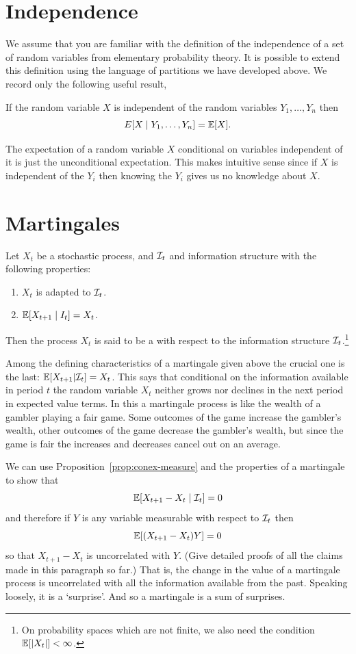 \documentclass[11pt,reqno,openany]{amsbook}
\begin{document}
\section{Independence}
We assume that you are familiar with the definition of the
independence of a set of random variables from elementary
probability theory. It is possible to extend this definition
using the language of partitions we have developed above. We
record only the following useful result,

\begin{prop}
  If the random variable $X$ is independent of the random
  variables $Y_1,\ldots,Y_n$ then
  \[E[X \mid Y_1,\ldots,Y_n] = \mathbb{E}[X].\]
\end{prop}
The expectation of a random variable $X$ conditional on
variables independent of it is just the unconditional
expectation. This makes intuitive sense since if $X$ is
independent of the $Y_i$ then knowing the $Y_i$ gives us no
knowledge about $X$.


\section{Martingales}
\begin{defn}[Martingale]
Let $X_t$ be a stochastic process, and $\mathcal{I}_t$ and
information structure with the following properties:
\begin{enumerate}
\item $X_t$ is adapted to $\mathcal{I}_t$.
\item $\mathbb{E}[X_{t+1} \mid I_t]=X_t$.
\end{enumerate}
Then the process $X_t$ is said to be a  with
respect to the information structure
$\mathcal{I}_t$.\footnote{On probability spaces which are not
  finite, we also need the condition $\mathbb{E}[|X_t|]<\infty$.}
\end{defn}

Among the defining characteristics of a martingale given above the
crucial one is the last: $\mathbb{E}[X_{t+1}|\mathcal{I}_t]=X_t$. This says that
conditional on the information available in period $t$ the random
variable $X_t$ neither grows nor declines in the next period in
expected value terms. In this a martingale process is like the wealth
of a gambler playing a fair game. Some outcomes of the game increase
the gambler's wealth, other outcomes of the game decrease the
gambler's wealth, but since the game is fair the increases and
decreases cancel out on an average.

We can use Proposition~\ref{prop:conex-measure} and the properties of
a martingale to show that
\[\mathbb{E}[X_{t+1}-X_t \mid \mathcal{I}_t]=0\]
and therefore if $Y$ is any variable measurable with respect
to $\mathcal{I}_t$ then
\[\mathbb{E}[(X_{t+1}-X_{t})Y]=0\]
so that $X_{t+1}-X_t$ is uncorrelated with $Y$. (Give detailed proofs
of all the claims made in this paragraph so far.) That is, the change
in the value of a martingale process is uncorrelated with all the
information available from the past. Speaking loosely, it is a
`surprise'. And so a martingale is a sum of surprises.
\end{document}

